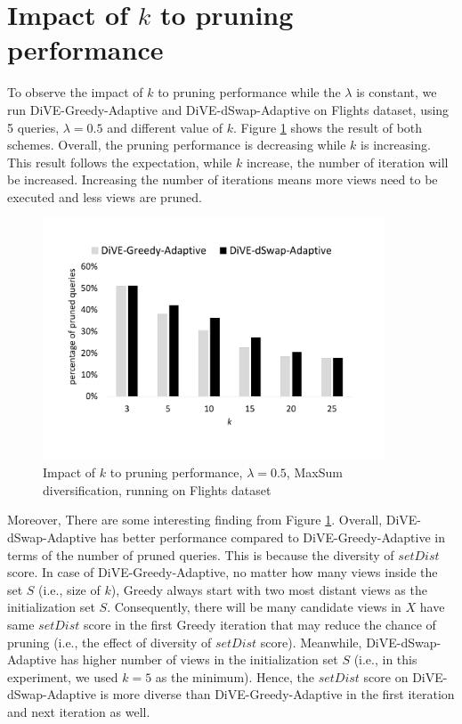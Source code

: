 \documentclass{article}
\begin{document}
\section{Impact of $ k $ to pruning performance}


To observe the impact of $k$ to pruning performance while the $\lambda$ is constant, we run DiVE-Greedy-Adaptive and DiVE-dSwap-Adaptive on Flights dataset, using 5 queries, $\lambda = 0.5$ and different value of $k$. Figure \ref{fig:impact-of-k-pruning-performance} shows the result of both schemes. Overall, the pruning performance is decreasing while $k$ is increasing. This result follows the expectation, while $k$ increase, the number of iteration will be increased. Increasing the number of iterations means more views need to be executed and less views are pruned. 
\begin{figure}
	\begin{center}
		\includegraphics[width=4.0in]{figures/Impact_k_performance}
		\vspace{-30pt}
		\caption{Impact of $k$ to pruning performance, $\lambda = 0.5$, MaxSum diversification, running on Flights dataset}
		\label{fig:impact-of-k-pruning-performance}
		
	\end{center}
\end{figure}

Moreover, There are some interesting finding from Figure \ref{fig:impact-of-k-pruning-performance}. Overall, DiVE-dSwap-Adaptive has better performance compared to DiVE-Greedy-Adaptive in terms of the number of pruned queries. This is because the diversity of $setDist$ score. In case of DiVE-Greedy-Adaptive, no matter how many views inside the set $S$ (i.e., size of $k$), Greedy always start with two most distant views as the initialization set $S$. Consequently, there will be many candidate views in $X$ have same $setDist$ score in the first Greedy iteration that may reduce the chance of pruning (i.e., the effect of diversity of $setDist$ score). Meanwhile,  DiVE-dSwap-Adaptive has higher number of views in the initialization set $S$ (i.e., in this experiment, we used $k = 5$ as the minimum). Hence, the $setDist$ score on DiVE-dSwap-Adaptive is more diverse than DiVE-Greedy-Adaptive in the first iteration and next iteration as well. 
\end{document}

